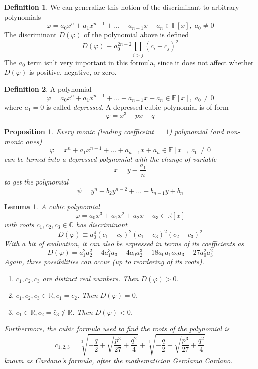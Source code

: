\documentclass{article}
\newtheorem{proposition}[theorem]{Proposition}
\newtheorem{lemma}[theorem]{Lemma}
\theoremstyle{remark}
\theoremstyle{definition}
\newtheorem{definition}{Definition}[section]
\begin{document}
\begin{definition}
We can generalize this notion of the discriminant to arbitrary polynomials
\[\varphi = a_0 x^n + a_1 x^{n-1} + ... + a_{n-1} x + a_n \in \mathbb{F}[x], \; a_0 \neq 0\]
The discriminant $D(\varphi)$ of the polynomial above is defined
\[D(\varphi) \equiv a_0^{2n-2} \prod_{i>j} (c_i - c_j)^2\]
The $a_0$ term isn't very important in this formula, since it does not affect whether $D(\varphi)$ is positive, negative, or zero. 
\end{definition}

\begin{definition}
A polynomial 
\[\varphi = a_0 x^n + a_1 x^{n-1} + ... + a_{n-1} x + a_n \in \mathbb{F}[x], \; a_0 \neq 0\]
where $a_1 = 0$ is called \textit{depressed}. A depressed cubic polynomial is of form
\[\varphi = x^3 + p x + q\]
\end{definition}

\begin{proposition}
Every monic (leading coefficeint $=1$) polynomial (and non-monic ones) 
\[\varphi = x^n + a_1 x^{n-1} + ... + a_{n-1} x + a_n \in \mathbb{F}[x], \; a_0 \neq 0\]
can be turned into a depressed polynomial with the change of variable
\[x = y - \frac{a_1}{n}\]
to get the polynomial 
\[\psi = y^n + b_2 y^{n-2} + ... + b_{n-1} y + b_n\]
\end{proposition}

\begin{lemma}
A cubic polynomial 
\[\varphi = a_0 x^3 + a_1 x^2 + a_2 x + a_3 \in \mathbb{R}[x]\]
with roots $c_1, c_2, c_3 \in \mathbb{C}$ has discriminant
\[D(\varphi) \equiv a_0^4 (c_1 - c_2)^2 (c_1 - c_3)^2 (c_2 - c_3)^2\]
With a bit of evaluation, it can also be expressed in terms of its coefficients as
\[D(\varphi) = a_1^2 a_2^2 - 4a_1^3 a_3 - 4a_0 a_2^3 + 18 a_0 a_1 a_2 a_3 - 27 a_0^2 a_3^2\]
Again, three possibilities can occur (up to reordering of its roots). 
\begin{enumerate}
    \item $c_1, c_2, c_3$ are distinct real numbers. Then $D(\varphi) > 0$. 
    \item $c_1, c_2, c_3 \in \mathbb{R}, c_1 = c_2$. Then $D(\varphi) = 0$. 
    \item $c_1 \in \mathbb{R}, c_2 = \bar{c}_3 \not\in \mathbb{R}$. Then $D(\varphi) < 0$. 
\end{enumerate}
Furthermore, the cubic formula used to find the roots of the polynomial is 
\[c_{1, 2, 3} = \sqrt[3]{-\frac{q}{2} + \sqrt{\frac{p^3}{27} + \frac{q^2}{4}}} + \sqrt[3]{-\frac{q}{2} - \sqrt{\frac{p^3}{27} + \frac{q^2}{4}}}\]
known as \textit{Cardano's formula}, after the mathematician Gerolamo Cardano. 
\end{lemma}
\end{document}
